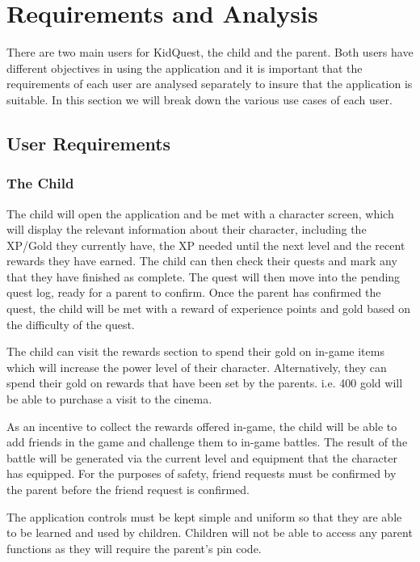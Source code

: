 

\chapter{Requirements and Analysis}
\label{chap:methodology}

There are two main users for KidQuest, the child and the parent. 
Both users have different objectives in using the application and it is important that the requirements of each user are analysed separately to insure that the application is suitable.
In this section we will break down the various use cases of each user.

\section{User Requirements}

\subsection{The Child}
The child will open the application and be met with a character screen, which will display the relevant information about their character, including the XP/Gold they currently have, the XP needed until the next level and the recent rewards they have earned.
The child can then check their quests and mark any that they have finished as complete.
The quest will then move into the pending quest log, ready for a parent to confirm.
Once the parent has confirmed the quest, the child will be met with a reward of experience points and gold based on the difficulty of the quest.

The child can visit the rewards section to spend their gold on in-game items which will increase the power level of their character. 
Alternatively, they can spend their gold on rewards that have been set by the parents. 
i.e. 400 gold will be able to purchase a visit to the cinema.

As an incentive to collect the rewards offered in-game, the child will be able to add friends in the game and challenge them to in-game battles. 
The result of the battle will be generated via the current level and equipment that the character has equipped. 
For the purposes of safety, friend requests must be confirmed by the parent before the friend request is confirmed.

The application controls must be kept simple and uniform so that they are able to be learned and used by children.
Children will not be able to access any parent functions as they will require the parent's pin code. 

